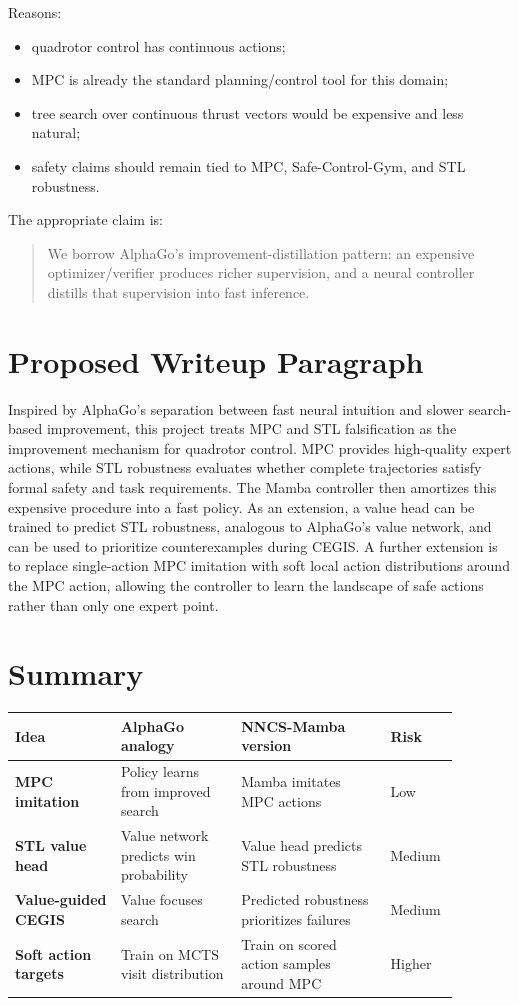 \documentclass[11pt]{article}
\begin{document}
Reasons:

\begin{itemize}
  \item quadrotor control has continuous actions;
  \item MPC is already the standard planning/control tool for this domain;
  \item tree search over continuous thrust vectors would be expensive and less natural;
  \item safety claims should remain tied to MPC, Safe-Control-Gym, and STL robustness.
\end{itemize}

The appropriate claim is:

\begin{quote}
We borrow AlphaGo's improvement-distillation pattern: an expensive optimizer/verifier produces richer supervision, and a neural controller distills that supervision into fast inference.
\end{quote}

\section{Proposed Writeup Paragraph}

Inspired by AlphaGo's separation between fast neural intuition and slower search-based improvement, this project treats MPC and STL falsification as the improvement mechanism for quadrotor control. MPC provides high-quality expert actions, while STL robustness evaluates whether complete trajectories satisfy formal safety and task requirements. The Mamba controller then amortizes this expensive procedure into a fast policy. As an extension, a value head can be trained to predict STL robustness, analogous to AlphaGo's value network, and can be used to prioritize counterexamples during CEGIS. A further extension is to replace single-action MPC imitation with soft local action distributions around the MPC action, allowing the controller to learn the landscape of safe actions rather than only one expert point.

\section{Summary}

\begin{center}
\begin{tabular}{>{\bfseries}p{0.22\linewidth}p{0.25\linewidth}p{0.31\linewidth}p{0.10\linewidth}}
\toprule
Idea & AlphaGo analogy & NNCS-Mamba version & Risk \\
\midrule
MPC imitation & Policy learns from improved search & Mamba imitates MPC actions & Low \\
STL value head & Value network predicts win probability & Value head predicts STL robustness & Medium \\
Value-guided CEGIS & Value focuses search & Predicted robustness prioritizes failures & Medium \\
Soft action targets & Train on MCTS visit distribution & Train on scored action samples around MPC & Higher \\
\bottomrule
\end{tabular}
\end{center}
\end{document}
